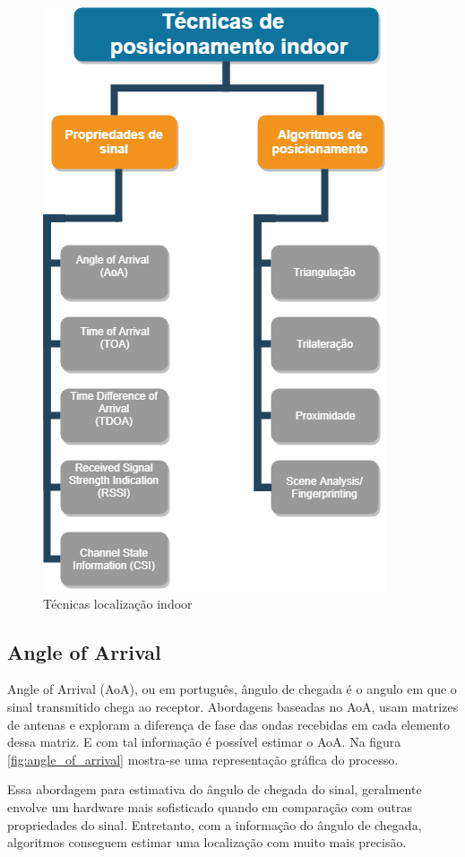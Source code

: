 \begin{figure}[H]
	\centering
	\includegraphics[scale = 0.4]{images/tecnicas_posicionamento_indoor.png}
	\caption{Técnicas localização indoor}
	\label{fig:tecnicas_posicionamento_indoor}
  \end{figure}


\subsection{Angle of Arrival}
\label{sec:AoA}

Angle of Arrival (AoA), ou em português, ângulo de chegada é o angulo em que o sinal transmitido chega ao receptor. Abordagens baseadas no AoA, usam matrizes de antenas e exploram a diferença de fase das ondas recebidas em cada elemento dessa matriz. E com tal informação é possível estimar o AoA. Na figura \ref{fig:angle_of_arrival} mostra-se uma representação gráfica do processo.

Essa abordagem para estimativa do ângulo de chegada do sinal, geralmente envolve um hardware mais sofisticado quando em comparação com outras propriedades do sinal. Entretanto, com a informação do ângulo de chegada, algoritmos conseguem estimar uma localização com muito mais precisão.\cite{art2}


